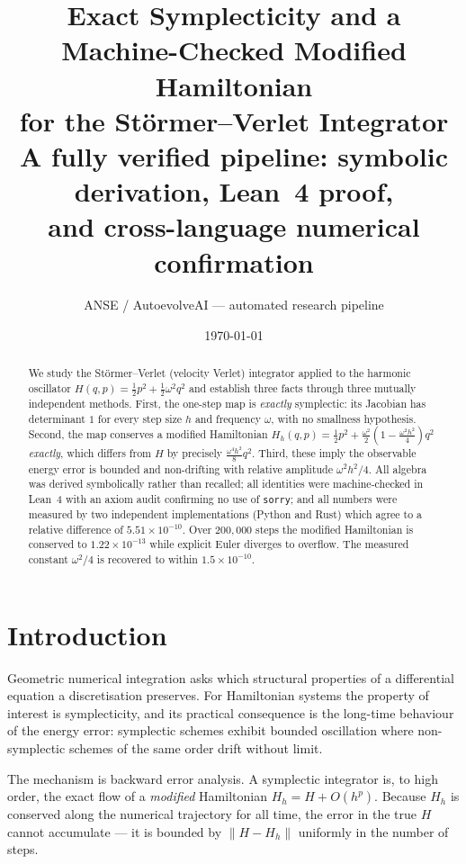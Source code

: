 \documentclass[11pt,a4paper]{article}
\title{\textbf{Exact Symplecticity and a Machine-Checked Modified Hamiltonian\\
for the St\"ormer--Verlet Integrator}\\[0.4em]
\large A fully verified pipeline: symbolic derivation, Lean~4 proof,\\
and cross-language numerical confirmation}
\author{ANSE / AutoevolveAI --- automated research pipeline}
\date{\today}
\begin{document}
\maketitle

\begin{abstract}
We study the St\"ormer--Verlet (velocity Verlet) integrator applied to the
harmonic oscillator $H(q,p)=\tfrac12 p^2+\tfrac12\omega^2q^2$ and establish three
facts through three mutually independent methods. First, the one-step map is
\emph{exactly} symplectic: its Jacobian has determinant $1$ for every step size
$h$ and frequency $\omega$, with no smallness hypothesis. Second, the map conserves
a modified Hamiltonian
$H_h(q,p)=\tfrac12p^2+\tfrac{\omega^2}{2}\!\left(1-\tfrac{\omega^2h^2}{4}\right)q^2$
\emph{exactly}, which differs from $H$ by precisely
$\tfrac{\omega^4h^2}{8}q^2$. Third, these imply the observable energy error is
bounded and non-drifting with relative amplitude $\omega^2h^2/4$. All algebra was
derived symbolically rather than recalled; all identities were machine-checked in
Lean~4 with an axiom audit confirming no use of \texttt{sorry}; and all numbers
were measured by two independent implementations (Python and Rust) which agree to
a relative difference of $5.51\times 10^{-10}$. Over
$200,000$ steps the modified Hamiltonian is conserved to
$1.22\times 10^{-13}$ while explicit Euler diverges to
overflow. The measured constant $\omega^2/4$ is recovered to within
$1.5\times 10^{-10}$.
\end{abstract}

\section{Introduction}

Geometric numerical integration asks which structural properties of a
differential equation a discretisation preserves. For Hamiltonian systems the
property of interest is symplecticity, and its practical consequence is the
long-time behaviour of the energy error: symplectic schemes exhibit bounded
oscillation where non-symplectic schemes of the same order drift without limit.

The mechanism is backward error analysis. A symplectic integrator is, to high
order, the exact flow of a \emph{modified} Hamiltonian $H_h = H + O(h^p)$. Because
$H_h$ is conserved along the numerical trajectory for all time, the error in the
true $H$ cannot accumulate --- it is bounded by $\|H-H_h\|$ uniformly in the
number of steps.
\end{document}
